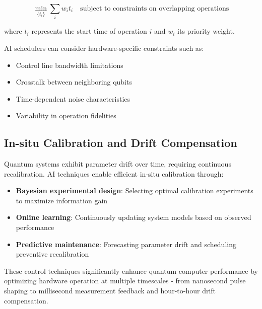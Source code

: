 \begin{equation}
\min_{\{t_i\}} \sum_i w_i t_i \quad \text{subject to constraints on overlapping operations}
\end{equation}

where $t_i$ represents the start time of operation $i$ and $w_i$ its priority weight.

AI schedulers can consider hardware-specific constraints such as:
\begin{itemize}
    \item Control line bandwidth limitations
    \item Crosstalk between neighboring qubits
    \item Time-dependent noise characteristics
    \item Variability in operation fidelities
\end{itemize}

\subsection{In-situ Calibration and Drift Compensation}
Quantum systems exhibit parameter drift over time, requiring continuous recalibration. AI techniques enable efficient in-situ calibration through:

\begin{itemize}
    \item \textbf{Bayesian experimental design}: Selecting optimal calibration experiments to maximize information gain
    
    \item \textbf{Online learning}: Continuously updating system models based on observed performance
    
    \item \textbf{Predictive maintenance}: Forecasting parameter drift and scheduling preventive recalibration
\end{itemize}

These control techniques significantly enhance quantum computer performance by optimizing hardware operation at multiple timescales - from nanosecond pulse shaping to millisecond measurement feedback and hour-to-hour drift compensation. 
